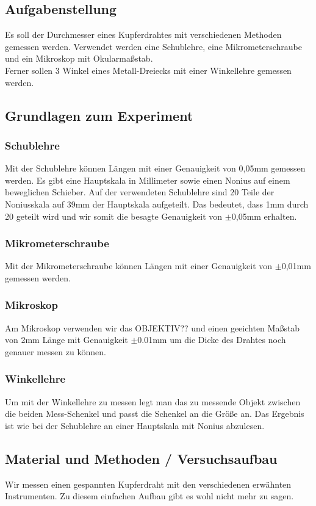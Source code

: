\documentclass{article}
\begin{document}
\subsection{Aufgabenstellung}
Es soll der Durchmesser eines Kupferdrahtes mit verschiedenen Methoden gemessen werden. Verwendet werden eine Schublehre, eine Mikrometerschraube und ein Mikroskop mit Okularmaßstab.\\
Ferner sollen 3 Winkel eines Metall-Dreiecks mit einer Winkellehre gemessen werden.

\subsection{Grundlagen zum Experiment}
\subsubsection*{Schublehre}
Mit der Schublehre können Längen mit einer Genauigkeit von 0,05mm gemessen werden. Es gibt eine Hauptskala in Millimeter sowie einen Nonius auf einem beweglichen Schieber. Auf der verwendeten Schublehre sind 20 Teile der Noniusskala auf 39mm der Hauptskala aufgeteilt. Das bedeutet, dass 1mm durch 20 geteilt wird und wir somit die besagte Genauigkeit von $\pm$0,05mm erhalten.\\
\subsubsection*{Mikrometerschraube}
Mit der Mikrometerschraube können Längen mit einer Genauigkeit von $\pm$0,01mm gemessen werden.

\subsubsection*{Mikroskop}
Am Mikroskop verwenden wir das OBJEKTIV?? und einen geeichten Maßstab von 2mm Länge mit Genauigkeit $\pm$0.01mm um die Dicke des Drahtes noch genauer messen zu können. 
\subsubsection*{Winkellehre}
Um mit der Winkellehre zu messen legt man das zu messende Objekt zwischen die beiden Mess-Schenkel und passt die Schenkel an die Größe an. Das Ergebnis ist wie bei der Schublehre an einer Hauptskala mit Nonius abzulesen.

\subsection{Material und Methoden / Versuchsaufbau}
Wir messen einen gespannten Kupferdraht mit den verschiedenen erwähnten Instrumenten. Zu diesem einfachen Aufbau gibt es wohl nicht mehr zu sagen.
\end{document}
